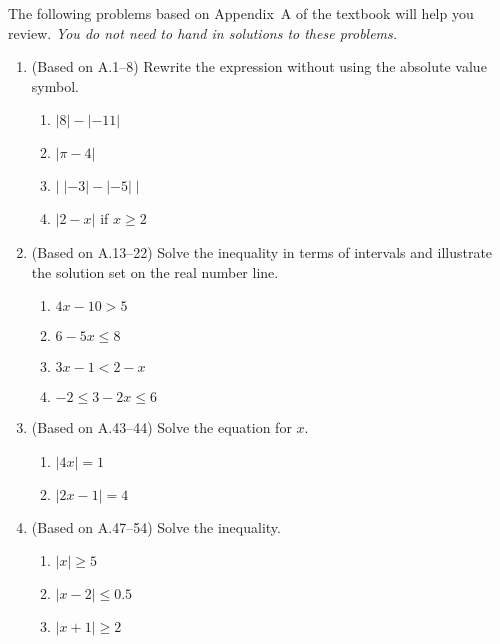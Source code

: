 \documentclass[11pt]{article}
\title{\commonPSTitleZeroZeroA}
\author{\commonAuthor}
\date{\commonDateZeroZeroA}
\newcommand{\ds}{\displaystyle}
\begin{document}
\maketitle
\thispagestyle{empty}

\noindent
The following problems based on Appendix~A of the textbook will help
you review.  \emph{You do not need to hand in solutions to these
  problems.}
\begin{enumerate}
\item (Based on A.1--8) Rewrite the expression without using the
  absolute value symbol.
  \begin{multicols}{4}
  \begin{enumerate}
  \item $\ds |8|-|-11|$
  \item $\ds |\pi-4|$
  \item $\ds \big| \; |-3|-|-5| \; \big|$
  \item $\ds |2-x|$ if $\ds x\ge 2$
  \end{enumerate}
  \end{multicols}
\item (Based on A.13--22) Solve the inequality in terms of intervals
  and illustrate the solution set on the real number line.
  \begin{multicols}{4}
  \begin{enumerate}
  \item $\ds 4x-10>5$
  \item $\ds 6-5x\le 8$
  \item $\ds 3x-1<2-x$
  \item $\ds -2\le 3-2x\le 6$
  \end{enumerate}
  \end{multicols}
\item (Based on A.43--44) Solve the equation for $x$.
  \begin{multicols}{2}
  \begin{enumerate}
  \item $\ds |4x|=1$
  \item $\ds |2x-1|=4$
  \end{enumerate}
  \end{multicols}
\item (Based on A.47--54) Solve the inequality.
  \begin{multicols}{4}
  \begin{enumerate}
  \item $\ds |x|\ge 5$
  \item $\ds |x-2|\le 0.5$
  \item $\ds |x+1|\ge 2$

\end{enumerate}
\end{multicols}
\end{enumerate}
\end{document}
